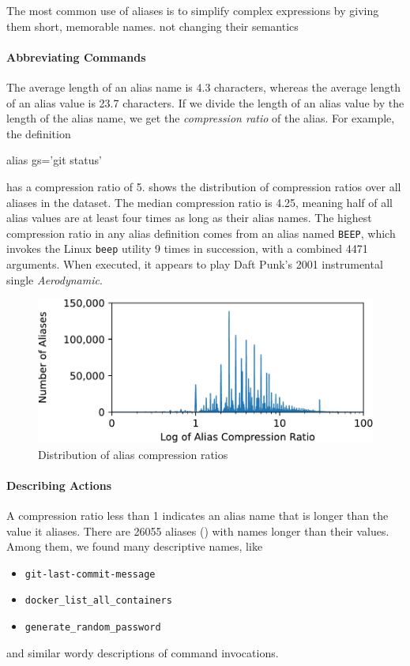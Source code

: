 The most common use of aliases is to simplify complex expressions by giving them short, memorable names.
\TODO not changing their semantics

\paragraph{\bf Abbreviating Commands}

The average length of an alias name is 4.3 characters, whereas the average length of an alias value is 23.7 characters.
If we divide the length of an alias value by the length of the alias name, we get the \emph{compression ratio} of the alias.
For example, the definition
\begin{CVerbatim}
alias gs='git status'
\end{CVerbatim}
has a compression ratio of 5.
 shows the distribution of compression ratios over all aliases in the dataset.
The median compression ratio is 4.25, meaning half of all alias values are at least four times as long as their alias names.
The highest compression ratio in any alias definition comes from an alias named \verb|BEEP|, which invokes the Linux \verb|beep| utility 9 times in succession, with a combined \num{4471} arguments.
When executed, it appears to play Daft Punk's 2001 instrumental single \emph{Aerodynamic}.

\begin{figure}
    \centering
    \includegraphics[width=0.95\columnwidth]{figures/compression.pdf}
    \caption{Distribution of alias compression ratios}
    \label{fig:compression}
\end{figure}

\paragraph{\bf Describing Actions}

A compression ratio less than 1 indicates an alias name that is longer than the value it aliases.
There are \num{26055} aliases () with names longer than their values.
Among them, we found many descriptive names, like
\begin{itemize}
    \item \verb|git-last-commit-message|
    \item \verb|docker_list_all_containers|
    \item \verb|generate_random_password|
\end{itemize}
and similar wordy descriptions of command invocations.

